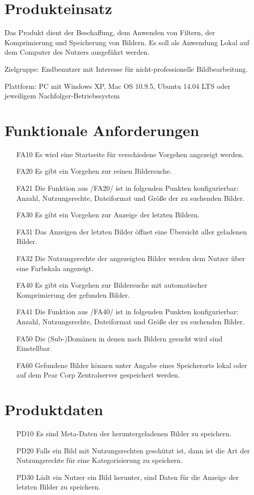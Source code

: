 \documentclass[parskip=full]{scrartcl}
\begin{document}
\section{Produkteinsatz}

Das Produkt dient der Beschaffung, dem Anwenden von Filtern, der Komprimierung und Speicherung von Bildern. Es soll als Anwendung Lokal auf dem \gls{Computer} des Nutzers ausgeführt werden.

Zielgruppe: Endbenutzer mit Interesse für nicht-professionelle Bildbearbeitung.

Plattform: PC mit Windows XP, Mac OS 10.9.5, Ubuntu 14.04 LTS oder jeweiligem Nachfolger-Betriebssystem

\section{Funktionale Anforderungen}
\begin{itemize}[nosep]
\item[FA10] Es wird eine Startseite für verschiedene Vorgehen angezeigt werden.
\item[FA20] Es gibt ein Vorgehen zur reinen Bildersuche.
	\item[FA21] Die Funktion aus /FA20/ ist in folgenden Punkten konfigurierbar: 
	Anzahl, Nutzungsrechte, Dateiformat und Größe der zu suchenden Bilder.
\item[FA30] Es gibt ein Vorgehen zur Anzeige der letzten Bildern.
	\item[FA31] Das Anzeigen der letzten Bilder öffnet eine Übersicht aller geladenen Bilder.
	\item[FA32] Die Nutzungsrechte der angezeigten Bilder werden dem Nutzer über eine Farbskala angezeigt.
\item[FA40] Es gibt ein Vorgehen zur Bildersuche mit automatischer Komprimierung der gefunden Bilder.
	\item[FA41] Die Funktion aus /FA40/ ist in folgenden Punkten konfigurierbar: 
	Anzahl, Nutzungsrechte, Dateiformat und Größe der zu suchenden Bilder.
\item[FA50] Die (Sub-)Domänen in denen nach Bildern gesucht wird sind Einstellbar.
\item[FA60] Gefundene Bilder können unter Angabe eines Speicherorts lokal oder auf dem Pear Corp Zentralserver gespeichert werden.
\end{itemize}

\section{Produktdaten}
\begin{itemize}[nosep]
\item[PD10] Es sind Meta-Daten der heruntergeladenen Bilder zu speichern.
\item[PD20] Falls ein Bild mit Nutzungsrechten geschützt ist, dann ist die Art der Nutzungsrechte für eine Kategorisierung zu speichern.
\item[PD30] Lädt ein Nutzer ein Bild herunter, sind Daten für die Anzeige der letzten Bilder zu speichern.
\end{itemize}
\end{document}
